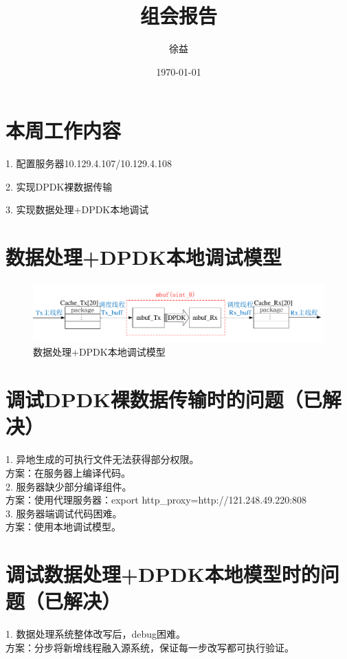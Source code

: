 \documentclass{article}
\title{组会报告}
\author{徐益}
\date{\today}
\begin{document}
	
\maketitle


\section{本周工作内容}

1. 配置服务器10.129.4.107/10.129.4.108

2. 实现DPDK裸数据传输

3. 实现数据处理+DPDK本地调试

\section{数据处理+DPDK本地调试模型}

\begin{figure}[H]
	\centering
	\includegraphics[width = \textwidth]{frame_mbuf.pdf}
	\caption{数据处理+DPDK本地调试模型}
\end{figure}

\section{调试DPDK裸数据传输时的问题（已解决）}
1. 异地生成的可执行文件无法获得部分权限。\\
方案：在服务器上编译代码。\\

2. 服务器缺少部分编译组件。\\
方案：使用代理服务器：export http\_proxy=http://121.248.49.220:808\\

3. 服务器端调试代码困难。\\
方案：使用本地调试模型。\\

\section{调试数据处理+DPDK本地模型时的问题（已解决）}
1. 数据处理系统整体改写后，debug困难。\\
方案：分步将新增线程融入源系统，保证每一步改写都可执行验证。\\
\end{document}
